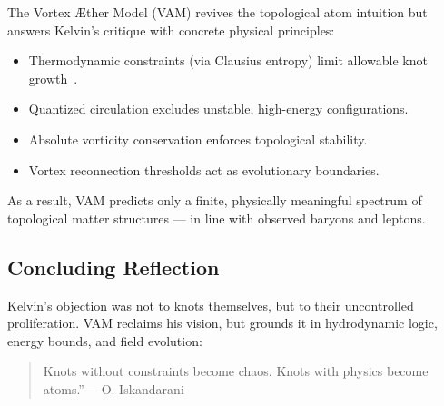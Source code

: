 The Vortex Æther Model (VAM) revives the topological atom intuition but answers Kelvin's critique with concrete physical principles:

\begin{itemize}
  \item Thermodynamic constraints (via Clausius entropy) limit allowable knot growth~\cite{clausius1865entropy}.
  \item Quantized circulation excludes unstable, high-energy configurations.
  \item Absolute vorticity conservation enforces topological stability.
  \item Vortex reconnection thresholds act as evolutionary boundaries.
\end{itemize}

As a result, VAM predicts only a finite, physically meaningful spectrum of topological matter structures — in line with observed baryons and leptons.

\subsection*{Concluding Reflection}

Kelvin's objection was not to knots themselves, but to their uncontrolled proliferation. VAM reclaims his vision, but grounds it in hydrodynamic logic, energy bounds, and field evolution:

\begin{quote}
\grqq Knots without constraints become chaos. Knots with physics become atoms.\textquotedblright — O. Iskandarani
\end{quote}

